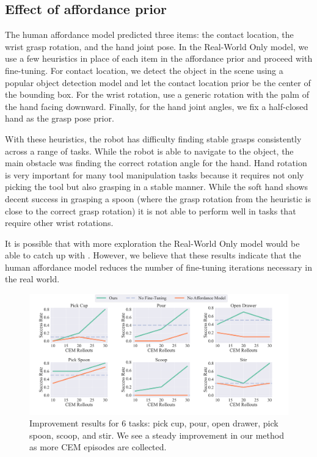 \subsection{Effect of affordance prior} 
The human affordance model predicted three items: the contact location, the wrist grasp rotation, and the hand joint pose. In the Real-World Only model, we use a few heuristics in place of each item in the affordance prior and proceed with fine-tuning. For contact location, we detect the object in the scene using a popular object detection model \cite{kirillov2023segment} and let the contact location prior be the center of the bounding box. For the wrist rotation, use a generic rotation with the palm of the hand facing downward. Finally, for the hand joint angles, we fix a half-closed hand as the grasp pose prior.  

With these heuristics, the robot has difficulty finding stable grasps consistently across a range of tasks. While the robot is able to navigate to the object, the main obstacle was finding the correct rotation angle for the hand. Hand rotation is very important for many tool manipulation tasks because it requires not only picking the tool but also grasping in a stable manner. While the soft hand shows decent success in grasping a spoon (where the grasp rotation from the heuristic is close to the correct grasp rotation) it is not able to perform well in tasks that require other wrist rotations.

It is possible that with more exploration the Real-World Only model would be able to catch up with \ours. However, we believe that these results indicate that the human affordance model reduces the number of fine-tuning iterations necessary in the real world.


\begin{figure}[t]
\centering
\includegraphics[width=\linewidth]{figs/graphs_main.pdf}
\vspace{-0.25in}
  \caption{\small Improvement results for 6 tasks: pick cup, pour, open drawer, pick spoon, scoop, and stir. We see a steady improvement in our method as more CEM episodes are collected.
}
 \label{fig:graph_main}
 \vspace{0.1in}
\end{figure}


